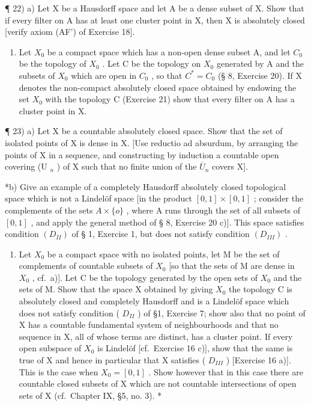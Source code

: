 ¶ 22) a) Let X be a Hausdorff space and let A be a dense subset of X. Show that if every filter on A has at least one cluster point in X, then X is absolutely closed {[}verify axiom (AF') of Exercise 18{]}.

\begin{enumerate}
\def\labelenumi{\alph{enumi})}
\setcounter{enumi}{1}
\tightlist
\item
  Let \(X_{0}\) be a compact space which has a non-open dense subset A, and let \(C_{0}\) be the topology of \(X_{0}\) . Let C be the topology on \(X_{0}\) generated by A and the subsets of \(X_{0}\) which are open in \(C_{0}\) , so that \(C^{*} = C_{0}\) (§ 8, Exercise 20). If X denotes the non-compact absolutely closed space obtained by endowing the set \(X_{0}\) with the topology C (Exercise 21) show that every filter on A has a cluster point in X.
\end{enumerate}

¶ 23) a) Let X be a countable absolutely closed space. Show that the set of isolated points of X is dense in X. {[}Use reductio ad absurdum, by arranging the points of X in a sequence, and constructing by induction a countable open covering (U \(_{n}\) ) of X such that no finite union of the \(\overline{U}_{n}\) covers X{]}.

*b) Give an example of a completely Hausdorff absolutely closed topological space which is not a Lindelöf space {[}in the product \([0,1]\times[0,1]\) ; consider the complements of the sets \(A\times\{o\}\) , where A runs through the set of all subsets of \([0,1]\) , and apply the general method of § 8, Exercise 20 c){]}. This space satisfies condition \((D_{II})\) of § 1, Exercise 1, but does not satisfy condition \((D_{III})\) .

\begin{enumerate}
\def\labelenumi{\alph{enumi})}
\setcounter{enumi}{2}
\tightlist
\item
  Let \(X_{0}\) be a compact space with no isolated points, let M be the set of complements of countable subsets of \(X_{0}\) {[}so that the sets of M are dense in \(X_{0}\) , cf.~a){]}. Let C be the topology generated by the open sets of \(X_{0}\) and the sets of M. Show that the space X obtained by giving \(X_{0}\) the topology C is absolutely closed and completely Hausdorff and is a Lindelöf space which does not satisfy condition ( \(D_{II}\) ) of §1, Exercise 7; show also that no point of X has a countable fundamental system of neighbourhoods and that no sequence in X, all of whose terms are distinct, has a cluster point. If every open subspace of \(X_{0}\) is Lindelöf {[}cf.~Exercise 16 c){]}, show that the same is true of X and hence in particular that X satisfies ( \(D_{III}\) ) {[}Exercise 16 a){]}. This is the case when \(X_{0} = [0,1]\) . Show however that in this case there are countable closed subsets of X which are not countable intersections of open sets of X (cf.~Chapter IX, §5, no. 3). *
\end{enumerate}

